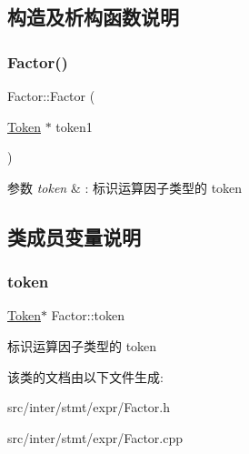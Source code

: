 \subsection{构造及析构函数说明}
\mbox{\label{class_factor_af17f55c01064dcb353c47243931d095a}} 
\subsubsection{\texorpdfstring{Factor()}{Factor()}}
{\footnotesize\ttfamily Factor\+::\+Factor (\begin{DoxyParamCaption}\item[{\hyperlink{class_token}{Token} $\ast$}]{token1 }\end{DoxyParamCaption})}


\begin{DoxyParams}{参数}
{\em token} & \+: 标识运算因子类型的 token \\
\hline
\end{DoxyParams}


\subsection{类成员变量说明}
\mbox{\label{class_factor_ab2c56fe952c0e3dad6006950e166495b}} 
\subsubsection{\texorpdfstring{token}{token}}
{\footnotesize\ttfamily \hyperlink{class_token}{Token}$\ast$ Factor\+::token}

标识运算因子类型的 token 

该类的文档由以下文件生成\+:\begin{DoxyCompactItemize}
\item 
src/inter/stmt/expr/Factor.\+h\item 
src/inter/stmt/expr/Factor.\+cpp\end{DoxyCompactItemize}
